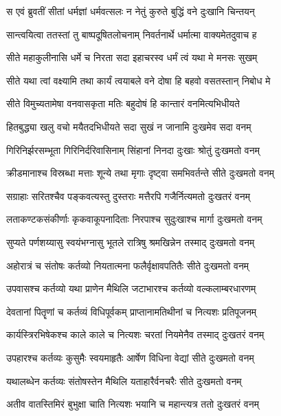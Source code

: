 
\twolineshloka
{स एवं ब्रुवतीं सीतां धर्मज्ञां धर्मवत्सलः}
{न नेतुं कुरुते बुद्धिं वने दुःखानि चिन्तयन्} %

\twolineshloka
{सान्त्वयित्वा ततस्तां तु बाष्पदूषितलोचनाम्}
{निवर्तनार्थे धर्मात्मा वाक्यमेतदुवाच ह} %

\twolineshloka
{सीते महाकुलीनासि धर्मे च निरता सदा}
{इहाचरस्व धर्मं त्वं यथा मे मनसः सुखम्} %

\twolineshloka
{सीते यथा त्वां वक्ष्यामि तथा कार्यं त्वयाबले}
{वने दोषा हि बहवो वसतस्तान् निबोध मे} %

\twolineshloka
{सीते विमुच्यतामेषा वनवासकृता मतिः}
{बहुदोषं हि कान्तारं वनमित्यभिधीयते} %

\twolineshloka
{हितबुद्ध्या खलु वचो मयैतदभिधीयते}
{सदा सुखं न जानामि दुःखमेव सदा वनम्} %

\twolineshloka
{गिरिनिर्झरसम्भूता गिरिनिर्दरिवासिनाम्}
{सिंहानां निनदा दुःखाः श्रोतुं दुःखमतो वनम्} %

\twolineshloka
{क्रीडमानाश्च विस्रब्धा मत्ताः शून्ये तथा मृगाः}
{दृष्ट्वा समभिवर्तन्ते सीते दुःखमतो वनम्} %

\twolineshloka
{सग्राहाः सरितश्चैव पङ्कवत्यस्तु दुस्तराः}
{मत्तैरपि गजैर्नित्यमतो दुःखतरं वनम्} %

\twolineshloka
{लताकण्टकसंकीर्णाः कृकवाकूपनादिताः}
{निरपाश्च सुदुःखाश्च मार्गा दुःखमतो वनम्} %

\twolineshloka
{सुप्यते पर्णशय्यासु स्वयंभग्नासु भूतले}
{रात्रिषु श्रमखिन्नेन तस्माद् दुःखमतो वनम्} %

\twolineshloka
{अहोरात्रं च संतोषः कर्तव्यो नियतात्मना}
{फलैर्वृक्षावपतितैः सीते दुःखमतो वनम्} %

\twolineshloka
{उपवासश्च कर्तव्यो यथा प्राणेन मैथिलि}
{जटाभारश्च कर्तव्यो वल्कलाम्बरधारणम्} %

\twolineshloka
{देवतानां पितॄणां च कर्तव्यं विधिपूर्वकम्}
{प्राप्तानामतिथीनां च नित्यशः प्रतिपूजनम्} %

\twolineshloka
{कार्यस्त्रिरभिषेकश्च काले काले च नित्यशः}
{चरतां नियमेनैव तस्माद् दुःखतरं वनम्} %

\twolineshloka
{उपहारश्च कर्तव्यः कुसुमैः स्वयमाहृतैः}
{आर्षेण विधिना वेद्यां सीते दुःखमतो वनम्} %

\twolineshloka
{यथालब्धेन कर्तव्यः संतोषस्तेन मैथिलि}
{यताहारैर्वनचरैः सीते दुःखमतो वनम्} %

\twolineshloka
{अतीव वातस्तिमिरं बुभुक्षा चाति नित्यशः}
{भयानि च महान्त्यत्र ततो दुःखतरं वनम्} %

